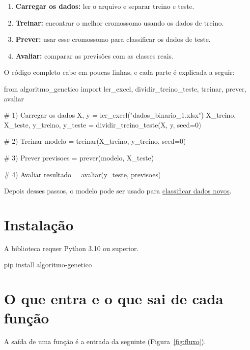 \documentclass[11pt,a4paper]{article}
\begin{document}
\begin{enumerate}
  \item \textbf{Carregar os dados:} ler o arquivo e separar treino e teste.
  \item \textbf{Treinar:} encontrar o melhor cromossomo usando os dados de treino.
  \item \textbf{Prever:} usar esse cromossomo para classificar os dados de teste.
  \item \textbf{Avaliar:} comparar as previsões com as classes reais.
\end{enumerate}

O código completo cabe em poucas linhas, e cada parte é explicada a seguir:

\begin{py}
from algoritmo_genetico import ler_excel, dividir_treino_teste, treinar, prever, avaliar

# 1) Carregar os dados
X, y = ler_excel("dados_binario_1.xlsx")
X_treino, X_teste, y_treino, y_teste = dividir_treino_teste(X, y, seed=0)

# 2) Treinar
modelo = treinar(X_treino, y_treino, seed=0)

# 3) Prever
previsoes = prever(modelo, X_teste)

# 4) Avaliar
resultado = avaliar(y_teste, previsoes)
\end{py}

Depois desses passos, o modelo pode ser usado para \hyperref[sec:novos]{classificar dados novos}.

\section{Instalação}

A biblioteca requer Python 3.10 ou superior.

\begin{py}
pip install algoritmo-genetico
\end{py}

\clearpage
\section{O que entra e o que sai de cada função}

A saída de uma função é a entrada da seguinte (Figura~\ref{fig:fluxo}).
\end{document}
